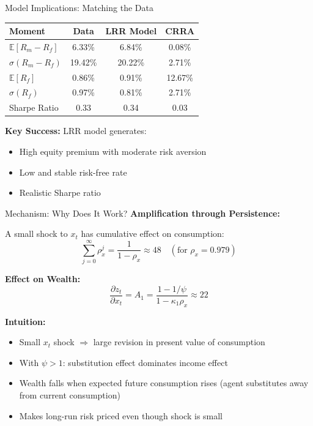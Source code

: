 \documentclass{beamer}
\newcommand{\E}{\mathbb{E}}
\begin{document}
\begin{frame}{Model Implications: Matching the Data}
    \begin{table}[h]
    \centering
    \small
    \begin{tabular}{lccc}
    \toprule
    \textbf{Moment} & \textbf{Data} & \textbf{LRR Model} & \textbf{CRRA} \\
    \midrule
    $\E[R_m - R_f]$ & 6.33\% & 6.84\% & 0.08\% \\
    $\sigma(R_m - R_f)$ & 19.42\% & 20.22\% & 2.71\% \\
    $\E[R_f]$ & 0.86\% & 0.91\% & 12.67\% \\
    $\sigma(R_f)$ & 0.97\% & 0.81\% & 2.71\% \\
    Sharpe Ratio & 0.33 & 0.34 & 0.03 \\
    \bottomrule
    \end{tabular}
    \end{table}
    
    \vspace{0.3cm}
    \textbf{Key Success:} LRR model generates:
    \begin{itemize}
        \item High equity premium with moderate risk aversion
        \item Low and stable risk-free rate
        \item Realistic Sharpe ratio
    \end{itemize}
\end{frame}

\begin{frame}{Mechanism: Why Does It Work?}
    \textbf{Amplification through Persistence:}
    
    A small shock to $x_t$ has cumulative effect on consumption:
    \begin{equation}
        \sum_{j=0}^{\infty} \rho_x^j = \frac{1}{1-\rho_x} \approx 48 \quad (\text{for } \rho_x = 0.979)
    \end{equation}
    
    \textbf{Effect on Wealth:}
    \begin{equation}
        \frac{\partial z_t}{\partial x_t} = A_1 = \frac{1-1/\psi}{1-\kappa_1\rho_x} \approx 22
    \end{equation}
    
    \textbf{Intuition:}
    \begin{itemize}
        \item Small $x_t$ shock $\Rightarrow$ large revision in present value of consumption
        \item With $\psi > 1$: substitution effect dominates income effect
        \item Wealth falls when expected future consumption rises (agent substitutes away from current consumption)
        \item Makes long-run risk priced even though shock is small
    \end{itemize}
\end{frame}
\end{document}
